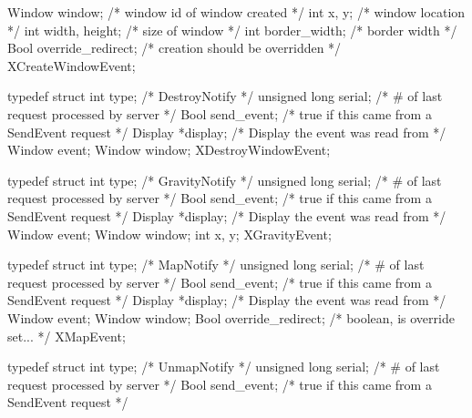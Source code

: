 \documentclass{report}
\begin{document}
\begin{itemize}
\begin{cppcode}
{                    Window window;              /* window id of window created */
                    int x, y;                   /* window location */
                    int width, height;          /* size of window */
                    int border_width;           /* border width */
                    Bool override_redirect;     /* creation should be overridden */
                } XCreateWindowEvent;
            \end{cppcode}
            \begin{cppcode}
                typedef struct {
                    int type; /* DestroyNotify */
                    unsigned long serial; /* # of last request processed by server */
                    Bool send_event; /* true if this came from a SendEvent request */
                    Display *display; /* Display the event was read from */
                    Window event;
                    Window window;
                } XDestroyWindowEvent;
            \end{cppcode}
            \begin{cppcode}
                typedef struct {
                    int type;               /* GravityNotify */
                    unsigned long serial;   /* # of last request processed by server */
                    Bool send_event;        /* true if this came from a SendEvent request */
                    Display *display;       /* Display the event was read from */
                    Window event;
                    Window window;
                    int x, y;
                } XGravityEvent;
            \end{cppcode}
            \begin{cppcode}
            typedef struct {
                int type;                   /* MapNotify */
                unsigned long serial;       /* # of last request processed by server */
                Bool send_event;            /* true if this came from a SendEvent request */
                Display *display;           /* Display the event was read from */
                Window event;
                Window window;
                Bool override_redirect;     /* boolean, is override set... */
            } XMapEvent;
            \end{cppcode}
            \begin{cppcode}
                typedef struct {
                    int type;               /* UnmapNotify */
                    unsigned long serial;   /* # of last request processed by server */
                    Bool send_event;        /* true if this came from a SendEvent request */
}
\end{cppcode}
\end{itemize}
\end{document}
